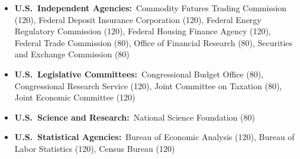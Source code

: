 \documentclass[12pt, aspectratio=169]{beamer}
\begin{document}
\begin{frame}[label=aerg]
\begin{itemize}
\item \textbf{U.S.\ Independent Agencies:}\ Commodity Futures Trading Commission (120), Federal Deposit Insurance Corporation (120), Federal Energy Regulatory Commission (120), Federal Housing Finance Agency (120), Federal Trade Commission (80), Office of Financial Research (80), Securities and Exchange Commission (80)
\item \textbf{U.S.\ Legislative Committees:}\ Congressional Budget Office (80), Congressional Research Service (120), Joint Committee on Taxation (80), Joint Economic Committee (120)
\item \textbf{U.S.\ Science and Research:}\ National Science Foundation (80)
\item \textbf{U.S.\ Statistical Agencies:}\ Bureau of Economic Analysis (120), Bureau of Labor Statistics (120), Census Bureau (120)
\vspace{5pt}
\end{itemize}
\hyperlink{dd}{}
\end{frame}
\end{document}
